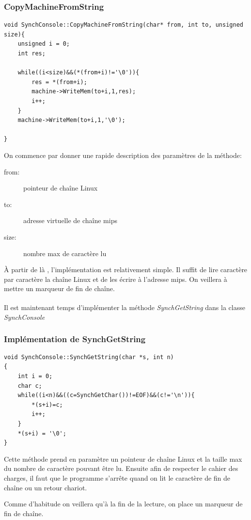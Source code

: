 \documentclass[a4paper,10pt]{report}
\begin{document}
     \textcolor{TealBlue}{\subsubsection*{CopyMachineFromString}}
     \begin{lstlisting}
void SynchConsole::CopyMachineFromString(char* from, int to, unsigned size){
	unsigned i = 0;
	int res;

	while((i<size)&&(*(from+i)!='\0')){
		res = *(from+i);
		machine->WriteMem(to+i,1,res);
		i++;
	}
	machine->WriteMem(to+i,1,'\0');

}      
     \end{lstlisting}
     On commence par donner une rapide description des paramètres de la méthode:
      \begin{description}
       \item[from:] pointeur de chaîne Linux
       \item[to:] adresse virtuelle de chaîne mips
       \item[size:] nombre max de caractère lu
      \end{description}
    À partir de là , l'implémentation est relativement simple. Il suffit de lire caractère par caractère la chaîne Linux et de les écrire à l'adresse mips.
    On veillera à mettre un marqueur de fin de chaîne. \\
    ~~\\   
    Il est maintenant temps d'implémenter la méthode \emph{SynchGetString} dans la classe \emph{SynchConsole}
    
     \textcolor{TealBlue}{\subsubsection*{Implémentation de SynchGetString}}
     \begin{lstlisting}
void SynchConsole::SynchGetString(char *s, int n)
{
	int i = 0;
	char c;
	while((i<n)&&((c=SynchGetChar())!=EOF)&&(c!='\n')){
		*(s+i)=c;
		i++;
	}
	*(s+i) = '\0';
}      
     \end{lstlisting}
     Cette méthode prend en paramètre un pointeur de chaîne Linux et la taille max du nombre de caractère pouvant être lu. Ensuite afin de respecter le 
     cahier des charges, il faut que le programme s'arrête quand on lit le caractère de fin de chaîne ou un retour chariot.
     
     Comme d'habitude on veillera qu'à la fin de la lecture, on place un marqueur de fin de chaîne.\\
     
\end{document}
